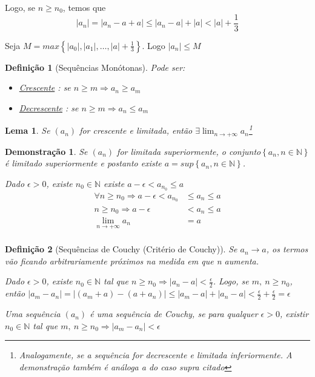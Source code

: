 \documentclass[12pt,openany, letterpaper]{book}
\newtheorem{lemma}{Lema}[section]
\newtheorem{definition}{Definição}[section]
\newtheorem{demonstration}{Demonstração}
\begin{document}
Logo, se $n \geq n_0$, temos que $$ |a_n| = |a_n - a + a| \leq |a_n - a| + |a| < |a| + \frac{1}{3}$$

Seja $M = max \left\{ |a_0|, |a_1|, \hdots , |a| +\frac{1}{3} \right\}$. Logo $|a_n| \leq M$

\begin{definition}[Sequências Monótonas]
\hspace{5mm} Pode ser:
\begin{itemize}
\item \underline{Crescente} : se $n \geq m \Rightarrow a_n \geq a_m $
\item \underline{Decrescente} : se $n \geq m \Rightarrow a_n \leq a_m $
\end{itemize}
\end{definition}

\begin{lemma}
Se $(a_n)$ for crescente e limitada, então $\displaystyle{\exists \lim_{n\rightarrow+\infty} a_n}$\footnote{Analogamente, se a sequência for decrescente e limitada inferiormente. A demonstração também é análoga a do caso supra citado}
\end{lemma}

\begin{demonstration}
Se $ (a_n) $ for limitada superiormente, o conjunto$\left\{a_n, n \in \mathds{N}\right\}$ é limitado superiormente e postanto existe $ a = sup \left\{a_n, n \in \mathds{N}\right\}$.

Dado $\epsilon > 0$, existe $n_0 \in \mathds{N}$ existe $a - \epsilon < a_{n_0} \leq a$
\begin{align*}
\forall n \geq n_0 \Rightarrow a - \epsilon < a_{n_0} &\leq a_n \leq a \\
n \geq n_0 \Rightarrow a - \epsilon &< a_n \leq a \\
\lim_{n \rightarrow +\infty} a_n &= a \\
\end{align*}
\end{demonstration}

\begin{definition}[Sequências de Couchy (Critério de Couchy)]
Se $a_n \rightarrow a$, os termos vão ficando arbitrariamente próximos na medida em que n aumenta. 

Dado $\epsilon > 0 $, existe $n_0 \in \mathds{N}$ tal que $n \geq n_0 \Rightarrow |a_n - a| < \frac{\epsilon}{2}$. Logo, se $m, \ n \geq n_0$, então $|a_m - a_n| = |(a_m + a) - (a + a_n)| \leq |a_m - a| + |a_n -a| < \displaystyle{\frac{\epsilon}{2}+\frac{\epsilon}{2}} = \epsilon$

Uma sequência $(a_n)$ é uma sequência de Couchy, se para qualquer $\epsilon > 0$, existir $n_0 \in \mathds{N}$ tal que $m, \ n \geq n_0 \Rightarrow |a_m - a_n| < \epsilon$
\end{definition}
\end{document}
